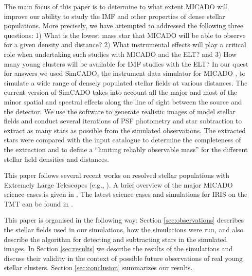 The main focus of this paper is to determine to what extent MICADO will improve our ability to study the IMF and other properties of dense stellar populations. More precisely, we have attempted to addressed the following three questions: 
1) What is the lowest mass star that MICADO will be able to observe for a given density and distance? 
2) What instrumental effects will play a critical role when undertaking such studies with MICADO and the ELT? and
3) How many young clusters will be available for IMF studies with the ELT? 
In our quest for answers we used SimCADO, the instrument data simulator for MICADO \citep{leschinski2016, leschinski19}, to simulate a wide range of densely populated stellar fields at various distances. 
The current version of SimCADO takes into account all the major and most of the minor spatial and spectral effects along the line of sight between the source and the detector. We use the software to generate realistic images of model stellar fields and  conduct several iterations of PSF photometry and star subtraction to extract as many stars as possible from the simulated observations. The extracted stars were compared with the input catalogue to determine the completeness of the extraction and to define a ``limiting reliably observable mass'' for the different stellar field densities and distances. 

This paper follows several recent works on resolved stellar populations with Extremely Large Telescopes 
(e.g., \citealt{deep11, greggio12, gullieuszik15, tolstoy19_iau}). A brief overview of the major MICADO science cases is given in \cite{micado2016}. The latest science cases and simulations for IRIS on the TMT can be found in \cite{tmt_iris16}.

This paper is organised in the following way: Section \ref{sec:observations} describes the stellar fields used in our simulations, how the simulations were run, and also describe the algorithm for detecting and subtracting stars in the simulated images. In Section \ref{sec:results} we describe the results of the simulations and discuss their validity in the context of possible future observations of real young stellar clusters. 
Section \ref{sec:conclusion} summarizes our results.
